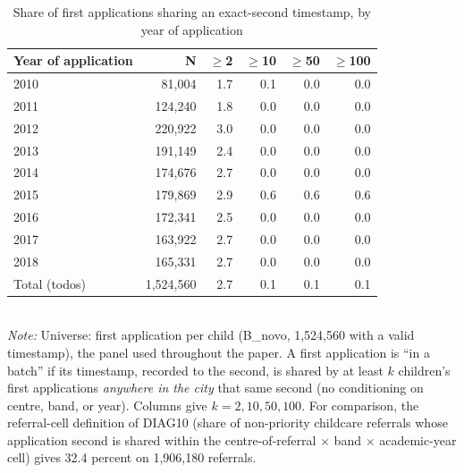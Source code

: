 \begin{table}[htbp]\centering
\caption{Share of first applications sharing an exact-second timestamp, by year of application}
\label{tab:N1}
\small
\setlength{\tabcolsep}{5pt}
\begin{tabular}{lrrrrr}
\toprule
Year of application & N & $\geq$2 & $\geq$10 & $\geq$50 & $\geq$100 \\
\midrule
2010 & 81,004 & 1.7 & 0.1 & 0.0 & 0.0 \\
2011 & 124,240 & 1.8 & 0.0 & 0.0 & 0.0 \\
2012 & 220,922 & 3.0 & 0.0 & 0.0 & 0.0 \\
2013 & 191,149 & 2.4 & 0.0 & 0.0 & 0.0 \\
2014 & 174,676 & 2.7 & 0.0 & 0.0 & 0.0 \\
2015 & 179,869 & 2.9 & 0.6 & 0.6 & 0.6 \\
2016 & 172,341 & 2.5 & 0.0 & 0.0 & 0.0 \\
2017 & 163,922 & 2.7 & 0.0 & 0.0 & 0.0 \\
2018 & 165,331 & 2.7 & 0.0 & 0.0 & 0.0 \\
\midrule
Total (todos) & 1,524,560 & 2.7 & 0.1 & 0.1 & 0.1 \\
\bottomrule
\end{tabular}
\\[3pt]{\footnotesize \textit{Note:} Universe: first application per child (B\_novo, 1,524,560 with a valid timestamp), the panel used throughout the paper. A first application is ``in a batch'' if its timestamp, recorded to the second, is shared by at least $k$ children's first applications \emph{anywhere in the city} that same second (no conditioning on centre, band, or year). Columns give $k=2,10,50,100$. For comparison, the referral-cell definition of DIAG10 (share of non-priority childcare referrals whose application second is shared within the centre-of-referral $\times$ band $\times$ academic-year cell) gives 32.4 percent on 1,906,180 referrals.}
\end{table}
